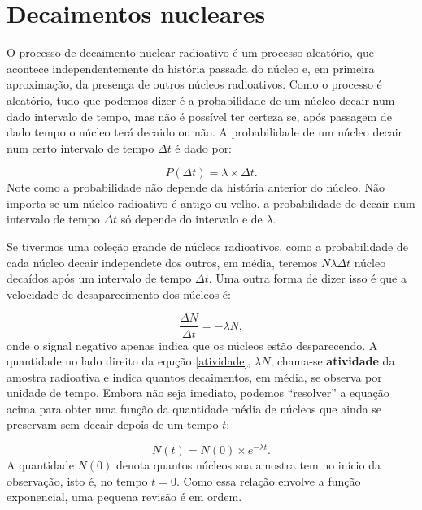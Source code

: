 \documentclass{article}
\begin{document}
\section{Decaimentos nucleares}

O processo de decaimento nuclear radioativo \'e um processo aleat\'orio, que acontece independentemente da hist\'oria passada do n\'ucleo e, em primeira aproxima\c c\~ao, da presen\c ca de outros n\'ucleos radioativos. Como o processo \'e aleat\'orio, tudo que podemos dizer \'e a probabilidade de um n\'ucleo decair num dado intervalo de tempo, mas n\~ao \'e poss\'ivel ter certeza se, ap\'os passagem de dado tempo o n\'ucleo ter\'a decaido ou n\~ao. A probabilidade de um n\'ucleo decair num certo intervalo de tempo $\Delta t$ \'e dado por:

\begin{equation}
P(\Delta t) = \lambda\times \Delta t.
\end{equation}
Note como a probabilidade n\~ao depende da hist\'oria anterior do n\'ucleo. N\~ao importa se um n\'ucleo radioativo \'e antigo ou velho, a probabilidade de decair num intervalo de tempo $\Delta t$ s\'o depende do intervalo e de $\lambda$.

Se tivermos uma cole\c c\~ao grande de n\'ucleos radioativos, como a probabilidade de cada n\'ucleo decair independete dos outros, em m\'edia, teremos $N \lambda \Delta t$ n\'ucleo deca\'idos ap\'os um intervalo de tempo $\Delta t$. Uma outra forma de dizer isso \'e que a velocidade de desaparecimento dos n\'ucleos \'e:

\begin{equation}\label{atividade}
\frac{\Delta N}{\Delta t} = -\lambda N,
\end{equation}
onde o signal negativo apenas indica que os n\'ucleos est\~ao desparecendo. A quantidade no lado direito da equ\c c\~ao \eqref{atividade}, $\lambda N$, chama-se \textbf{atividade} da amostra radioativa e indica quantos decaimentos, em m\'edia, se observa por unidade de tempo. Embora n\~ao seja imediato, podemos ``resolver'' a equa\c c\~ao acima para obter uma fun\c c\~ao da quantidade m\'edia de n\'ucleos que ainda se preservam sem decair depois de um tempo $t$:

\begin{equation}\label{decay}
N(t) = N(0)\times e^{-\lambda t}.
\end{equation}
A quantidade $N(0)$ denota quantos n\'ucleos sua amostra tem no in\'icio da observa\c c\~ao, isto \'e, no tempo $t=0$. Como essa rela\c c\~ao envolve a fun\c c\~ao exponencial, uma pequena revis\~ao \'e em ordem.
\end{document}
